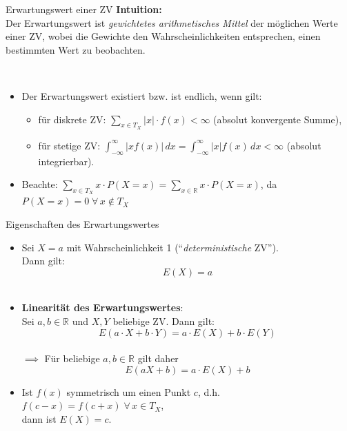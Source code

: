 \documentclass[
  10pt,
  ignorenonframetext,
]{beamer}
\providecommand{\tightlist}{%
  \setlength{\itemsep}{0pt}\setlength{\parskip}{0pt}}
\begin{document}
\begin{frame}{Erwartungswert einer ZV}
\protect\hypertarget{erwartungswert-einer-zv-1}{}
\textbf{Intuition:}\\
Der Erwartungswert ist \emph{gewichtetes arithmetisches Mittel} der
möglichen Werte einer ZV, wobei die Gewichte den Wahrscheinlichkeiten
entsprechen, einen bestimmten Wert zu beobachten.\\
\strut \\

\begin{itemize}
\item
  Der Erwartungswert existiert bzw. ist endlich, wenn gilt:

  \begin{itemize}
  \tightlist
  \item
    für diskrete ZV: \(\sum_{x \in T_X} |x| \cdot f(x) < \infty\)
    (absolut konvergente Summe),
  \item
    für stetige ZV:
    \(\int_{-\infty}^\infty |x f(x)| \,dx = \int_{-\infty}^\infty |x| f(x) \,dx< \infty\)
    (absolut integrierbar).
  \end{itemize}
\end{itemize}

\hfill\break

\begin{itemize}
\tightlist
\item
  Beachte:
  \(\sum_{x \in T_X} x \cdot P(X = x) = \sum_{x \in \mathbb{R}} x \cdot P(X = x)\),
  da \(P(X = x) = 0 \;\forall\, x \notin T_X\)
\end{itemize}
\end{frame}

\begin{frame}{Eigenschaften des Erwartungswertes}
\protect\hypertarget{eigenschaften-des-erwartungswertes}{}
\begin{itemize}
\item
  Sei \(X = a\) mit Wahrscheinlichkeit 1 (``\emph{deterministische}
  ZV'').\\
  Dann gilt: \[E(X) = a\]\\
\item
  \textbf{Linearität des Erwartungswertes}:\\
  Sei \(a, b \in \mathbb{R}\) und \(X, Y\) beliebige ZV. Dann gilt:
  \[E(a \cdot X + b \cdot Y) = a \cdot E (X) + b \cdot E (Y)\]\\
  \(\implies\) Für beliebige \(a, b \in \mathbb{R}\) gilt daher
  \[E(aX + b) = a \cdot E(X) + b\]
\item
  Ist \(f(x)\) symmetrisch um einen Punkt \(c\), d.h.
  \(f(c-x) = f(c+x) \;\forall\, x \in T_X\),\\
  dann ist \(E(X) = c\).\\
\end{itemize}

\end{frame}
\end{document}
